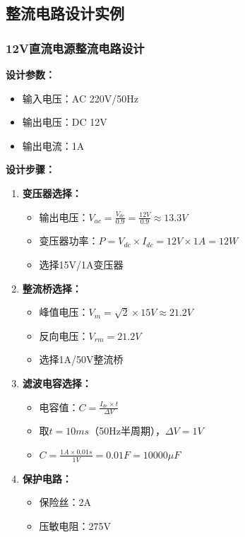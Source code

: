 \documentclass[12pt,UTF8]{ctexbook}
\begin{document}
\subsection{整流电路设计实例}

\subsubsection{12V直流电源整流电路设计}

\textbf{设计参数：}
\begin{itemize}
    \item 输入电压：AC 220V/50Hz
    \item 输出电压：DC 12V
    \item 输出电流：1A
\end{itemize}

\textbf{设计步骤：}

\begin{enumerate}
    \item \textbf{变压器选择：}
    \begin{itemize}
        \item 输出电压：$V_{ac} = \frac{V_{dc}}{0.9} = \frac{12V}{0.9} \approx 13.3V$
        \item 变压器功率：$P = V_{dc} \times I_{dc} = 12V \times 1A = 12W$
        \item 选择15V/1A变压器
    \end{itemize}

    \item \textbf{整流桥选择：}
    \begin{itemize}
        \item 峰值电压：$V_{m} = \sqrt{2} \times 15V \approx 21.2V$
        \item 反向电压：$V_{rm} = 21.2V$
        \item 选择1A/50V整流桥
    \end{itemize}

    \item \textbf{滤波电容选择：}
    \begin{itemize}
        \item 电容值：$C = \frac{I_{dc} \times t}{\Delta V}$
        \item 取$t = 10ms$（50Hz半周期），$\Delta V = 1V$
        \item $C = \frac{1A \times 0.01s}{1V} = 0.01F = 10000\mu F$
    \end{itemize}

    \item \textbf{保护电路：}
    \begin{itemize}
        \item 保险丝：2A
        \item 压敏电阻：275V
    \end{itemize}
\end{enumerate}
\end{document}
